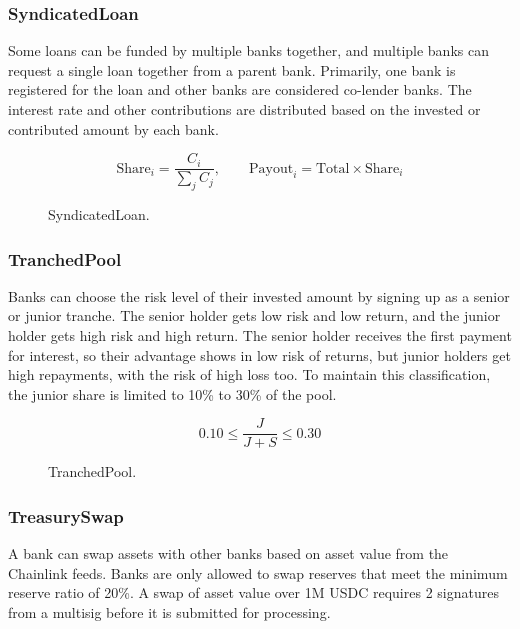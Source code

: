 \subsubsection{SyndicatedLoan}
\label{sec:syndicated-lending}

Some loans can be funded by multiple banks together, and multiple banks can request a single loan together from a parent bank. Primarily, one bank is registered for the loan and other banks are considered co-lender banks. The interest rate and other contributions are distributed based on the invested or contributed amount by each bank.

\[
\text{Share}_i = \frac{C_i}{\sum_{j} C_j}, \qquad \text{Payout}_i = \text{Total} \times \text{Share}_i
\]

\begin{figure}[H]
\centering
{}
\caption[SyndicatedLoan]{SyndicatedLoan.}
\label{fig:syndicated-loan}
\end{figure}

\subsubsection{TranchedPool}
\label{sec:tranched-pools}

Banks can choose the risk level of their invested amount by signing up as a senior or junior tranche. The senior holder gets low risk and low return, and the junior holder gets high risk and high return. The senior holder receives the first payment for interest, so their advantage shows in low risk of returns, but junior holders get high repayments, with the risk of high loss too. To maintain this classification, the junior share is limited to 10\% to 30\% of the pool.

\[
0.10 \leq \frac{J}{J+S} \leq 0.30
\]

\begin{figure}[H]
\centering
{}
\caption[TranchedPool]{TranchedPool.}
\label{fig:tranched-pool}
\end{figure}

\subsubsection{TreasurySwap}
\label{sec:treasury-fx}

A bank can swap assets with other banks based on asset value from the Chainlink feeds. Banks are only allowed to swap reserves that meet the minimum reserve ratio of 20\%. A swap of asset value over 1M USDC requires 2 signatures from a multisig before it is submitted for processing.

